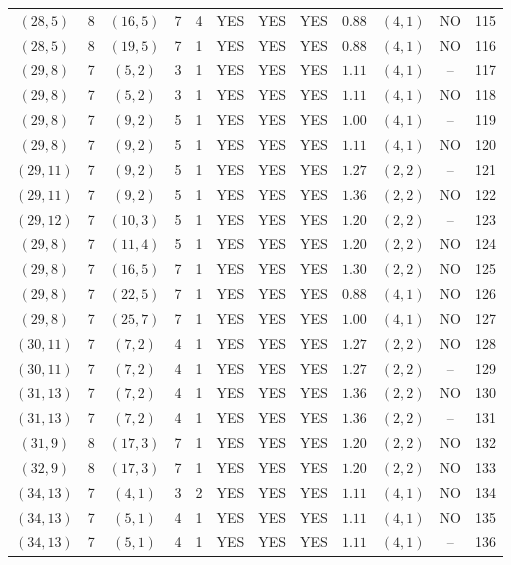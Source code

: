 \begin{longtable}{|c|c|c|c|c|c|c|c|c|c|c|c|}
$(28,5)$ & 8 & $(16,5)$ & 7 & 4 & YES & YES & YES & $0.88$ & $(4,1)$ & NO & 115\\
$(28,5)$ & 8 & $(19,5)$ & 7 & 1 & YES & YES & YES & $0.88$ & $(4,1)$ & NO & 116\\
$(29,8)$ & 7 & $(5,2)$ & 3 & 1 & YES & YES & YES & $1.11$ & $(4,1)$ & -- & 117\\
$(29,8)$ & 7 & $(5,2)$ & 3 & 1 & YES & YES & YES & $1.11$ & $(4,1)$ & NO & 118\\
$(29,8)$ & 7 & $(9,2)$ & 5 & 1 & YES & YES & YES & $1.00$ & $(4,1)$ & -- & 119\\
$(29,8)$ & 7 & $(9,2)$ & 5 & 1 & YES & YES & YES & $1.11$ & $(4,1)$ & NO & 120\\
$(29,11)$ & 7 & $(9,2)$ & 5 & 1 & YES & YES & YES & $1.27$ & $(2,2)$ & -- & 121\\
$(29,11)$ & 7 & $(9,2)$ & 5 & 1 & YES & YES & YES & $1.36$ & $(2,2)$ & NO & 122\\
$(29,12)$ & 7 & $(10,3)$ & 5 & 1 & YES & YES & YES & $1.20$ & $(2,2)$ & -- & 123\\
$(29,8)$ & 7 & $(11,4)$ & 5 & 1 & YES & YES & YES & $1.20$ & $(2,2)$ & NO & 124\\
$(29,8)$ & 7 & $(16,5)$ & 7 & 1 & YES & YES & YES & $1.30$ & $(2,2)$ & NO & 125\\
$(29,8)$ & 7 & $(22,5)$ & 7 & 1 & YES & YES & YES & $0.88$ & $(4,1)$ & NO & 126\\
$(29,8)$ & 7 & $(25,7)$ & 7 & 1 & YES & YES & YES & $1.00$ & $(4,1)$ & NO & 127\\
$(30,11)$ & 7 & $(7,2)$ & 4 & 1 & YES & YES & YES & $1.27$ & $(2,2)$ & NO & 128\\
$(30,11)$ & 7 & $(7,2)$ & 4 & 1 & YES & YES & YES & $1.27$ & $(2,2)$ & -- & 129\\
$(31,13)$ & 7 & $(7,2)$ & 4 & 1 & YES & YES & YES & $1.36$ & $(2,2)$ & NO & 130\\
$(31,13)$ & 7 & $(7,2)$ & 4 & 1 & YES & YES & YES & $1.36$ & $(2,2)$ & -- & 131\\
$(31,9)$ & 8 & $(17,3)$ & 7 & 1 & YES & YES & YES & $1.20$ & $(2,2)$ & NO & 132\\
$(32,9)$ & 8 & $(17,3)$ & 7 & 1 & YES & YES & YES & $1.20$ & $(2,2)$ & NO & 133\\
$(34,13)$ & 7 & $(4,1)$ & 3 & 2 & YES & YES & YES & $1.11$ & $(4,1)$ & NO & 134\\
$(34,13)$ & 7 & $(5,1)$ & 4 & 1 & YES & YES & YES & $1.11$ & $(4,1)$ & NO & 135\\
$(34,13)$ & 7 & $(5,1)$ & 4 & 1 & YES & YES & YES & $1.11$ & $(4,1)$ & -- & 136\\

\end{longtable}
